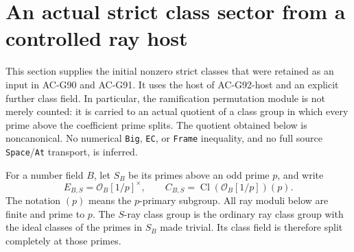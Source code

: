 \section{An actual strict class sector from a controlled ray host}
\label{sec:cubic-genus-class-sector}

This section supplies the initial nonzero strict classes that were
retained as an input in AC-G90 and AC-G91.  It uses the host of
AC-G92-host and an explicit further class field.  In particular, the
ramification permutation module is not merely counted: it is carried
to an actual quotient of a class group in which every prime above the
coefficient prime splits.  The quotient obtained below is noncanonical.
No numerical \texttt{Big}, \texttt{EC}, or \texttt{Frame} inequality,
and no full source \texttt{Space}/\texttt{At} transport, is inferred.

For a number field \(B\), let \(S_B\) be its primes above an odd
prime \(p\), and write
\[
 E_{B,S}=\mathcal O_B[1/p]^\times,\qquad
 C_{B,S}=\operatorname{Cl}(\mathcal O_B[1/p])(p).
 \tag{G93.1}
\]
The notation \((p)\) means the \(p\)-primary subgroup.  All ray
moduli below are finite and prime to \(p\).  The \(S\)-ray class
group is the ordinary ray class group with the ideal classes of the
primes in \(S_B\) made trivial.  Its class field is therefore split
completely at those primes.

